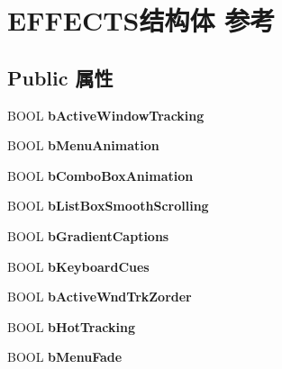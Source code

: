 \hypertarget{struct_e_f_f_e_c_t_s}{}\section{E\+F\+F\+E\+C\+T\+S结构体 参考}
\label{struct_e_f_f_e_c_t_s}
\subsection*{Public 属性}
\begin{DoxyCompactItemize}
\item 
\mbox{\label{struct_e_f_f_e_c_t_s_abcbf52381d0aa34718670ad401da9d65}} 
B\+O\+OL {\bfseries b\+Active\+Window\+Tracking}
\item 
\mbox{\label{struct_e_f_f_e_c_t_s_a4e4d0e167efecd9d60db7cd9bc5f7159}} 
B\+O\+OL {\bfseries b\+Menu\+Animation}
\item 
\mbox{\label{struct_e_f_f_e_c_t_s_a008c98f62a829cbed558b6ef75bb3a2f}} 
B\+O\+OL {\bfseries b\+Combo\+Box\+Animation}
\item 
\mbox{\label{struct_e_f_f_e_c_t_s_a92be9a2bdb044d2d6d35477f7cd46665}} 
B\+O\+OL {\bfseries b\+List\+Box\+Smooth\+Scrolling}
\item 
\mbox{\label{struct_e_f_f_e_c_t_s_a107b5f1528f9943d0d2d073d6bf8ff9e}} 
B\+O\+OL {\bfseries b\+Gradient\+Captions}
\item 
\mbox{\label{struct_e_f_f_e_c_t_s_a7c43828d84b6297f2c13dd4f31659862}} 
B\+O\+OL {\bfseries b\+Keyboard\+Cues}
\item 
\mbox{\label{struct_e_f_f_e_c_t_s_a1d984de762fc344c9375147eabfd3948}} 
B\+O\+OL {\bfseries b\+Active\+Wnd\+Trk\+Zorder}
\item 
\mbox{\label{struct_e_f_f_e_c_t_s_a5d4fb82ff5fc8e6a18044953b2a007f3}} 
B\+O\+OL {\bfseries b\+Hot\+Tracking}
\item 
\mbox{\label{struct_e_f_f_e_c_t_s_a8964ec615ba7ea19fbed2f55c0e8992a}} 
B\+O\+OL {\bfseries b\+Menu\+Fade}

\end{DoxyCompactItemize}
